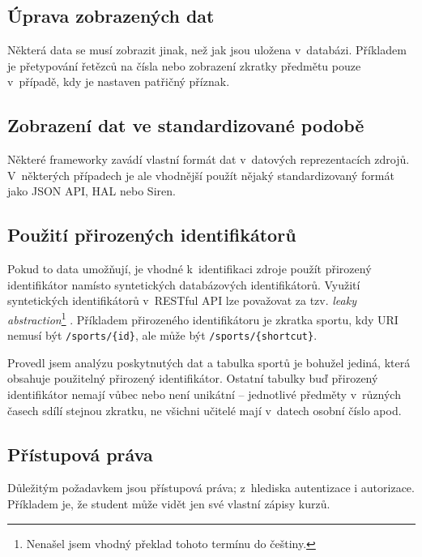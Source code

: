 \subsection{Úprava zobrazených dat}\label{uxfaprava-zobrazenuxfdch-dat}

Některá data se musí zobrazit jinak, než jak jsou uložena v~databázi. Příkladem je přetypování řetězců na čísla nebo zobrazení zkratky předmětu pouze v~případě, kdy je nastaven patřičný příznak.

\subsection{Zobrazení dat ve standardizované podobě}\label{zobrazenuxed-dat-ve-standardizovanuxe9-podobux11b}

Některé frameworky zavádí vlastní formát dat v~datových reprezentacích zdrojů. V~některých případech je ale vhodnější použít nějaký standardizovaný formát jako JSON API, HAL nebo Siren.

\subsection{Použití přirozených identifikátorů}\label{pouux17eituxed-pux159irozenuxfdch-identifikuxe1torux16f}

Pokud to data umožňují, je vhodné k~identifikaci zdroje použít přirozený identifikátor namísto syntetických databázových identifikátorů. Využití syntetických identifikátorů v~RESTful API lze považovat za tzv. \emph{leaky abstraction}\footnote{Nenašel jsem vhodný překlad tohoto termínu do češtiny.} \autocite{leakyab}. Příkladem přirozeného identifikátoru je zkratka sportu, kdy URI nemusí být \verb!/sports/{id}!, ale může být \verb!/sports/{shortcut}!.

Provedl jsem analýzu poskytnutých dat a tabulka sportů je bohužel jediná, která obsahuje použitelný přirozený identifikátor. Ostatní tabulky buď přirozený identifikátor nemají vůbec nebo není unikátní -- jednotlivé předměty v~různých časech sdílí stejnou zkratku, ne všichni učitelé mají v~datech osobní číslo apod.

\subsection{Přístupová práva}\label{pux159uxedstupovuxe1-pruxe1va}

Důležitým požadavkem jsou přístupová práva; z~hlediska autentizace i autorizace. Příkladem je, že student může vidět jen své vlastní zápisy kurzů.

